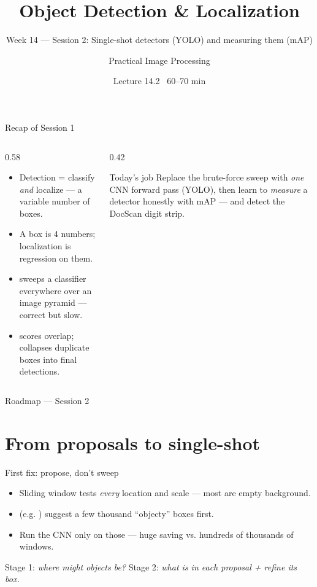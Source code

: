 \documentclass[10pt,aspectratio=169]{beamer}
\title{Object Detection \& Localization}
\subtitle{Week 14 — Session 2: Single-shot detectors (YOLO) and measuring them (mAP)}
\author{Practical Image Processing}
\date{Lecture 14.2 \textbullet\ 60--70 min}
\begin{document}
\maketitle

\begin{frame}{Recap of Session 1}
  \begin{columns}[T]
    \begin{column}{0.58\textwidth}
      \begin{itemize}
        \item Detection = classify \emph{and} localize --- a variable number of boxes.
        \item A box is 4 numbers; localization is regression on them.
        \item {} sweeps a classifier everywhere over an image pyramid --- correct but slow.
        \item {} scores overlap;  collapses duplicate boxes into final detections.
      \end{itemize}
    \end{column}
    \begin{column}{0.42\textwidth}
      \begin{alertblock}{Today's job}
        Replace the brute-force sweep with \emph{one} CNN forward pass (YOLO), then learn to \emph{measure} a detector honestly with mAP --- and detect the DocScan digit strip.
      \end{alertblock}
    \end{column}
  \end{columns}
\end{frame}

\begin{frame}{Roadmap --- Session 2}\tableofcontents\end{frame}

\section{From proposals to single-shot}

\begin{frame}{First fix: propose, don't sweep}
  \begin{itemize}
    \item Sliding window tests \emph{every} location and scale --- most are empty background.
    \item {} (e.g. ) suggest a few thousand ``objecty'' boxes first.
    \item Run the CNN only on those --- huge saving vs. hundreds of thousands of windows.
  \end{itemize}
  \begin{mathbox}
    Stage 1: \emph{where might objects be?} \quad Stage 2: \emph{what is in each proposal + refine its box.}
  \end{mathbox}
\end{frame}
\end{document}
